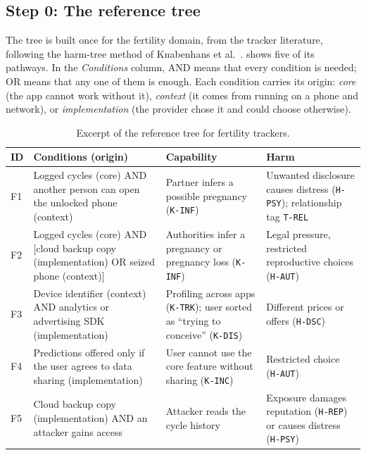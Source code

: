 \subsection*{Step 0: The reference tree}

The tree is built once for the fertility domain, from the tracker
literature, following the harm-tree method of Knabenhans et
al.~\parencite{knabenhans2026harms}.  shows five of its
pathways. In the \emph{Conditions} column, AND means that every condition is
needed; OR means that any one of them is enough. Each condition carries its
origin: \emph{core} (the app cannot work without it), \emph{context} (it comes
from running on a phone and network), or \emph{implementation} (the provider
chose it and could choose otherwise).

\begin{table}[H]
\centering
\caption{Excerpt of the reference tree for fertility trackers.}
\label{tab:we-tree}
\small
\begin{tabularx}{\textwidth}{@{}l>{\raggedright\arraybackslash}X
                                   >{\raggedright\arraybackslash}p{3.1cm}
                                   >{\raggedright\arraybackslash}p{3.3cm}@{}}
\toprule
\textbf{ID} & \textbf{Conditions (origin)} & \textbf{Capability} & \textbf{Harm} \\
\midrule
F1 & Logged cycles (core) AND another person can open the unlocked phone
     (context)
   & Partner infers a possible pregnancy (\texttt{K-INF})
   & Unwanted disclosure causes distress (\texttt{H-PSY}); relationship tag
     \texttt{T-REL} \\
\addlinespace
F2 & Logged cycles (core) AND [cloud backup copy (implementation) OR seized
     phone (context)]
   & Authorities infer a pregnancy or pregnancy loss (\texttt{K-INF})
   & Legal pressure, restricted reproductive choices (\texttt{H-AUT}) \\
\addlinespace
F3 & Device identifier (context) AND analytics or advertising SDK
     (implementation)
   & Profiling across apps (\texttt{K-TRK}); user sorted as
     \enquote{trying to conceive} (\texttt{K-DIS})
   & Different prices or offers (\texttt{H-DSC}) \\
\addlinespace
F4 & Predictions offered only if the user agrees to data sharing
     (implementation)
   & User cannot use the core feature without sharing (\texttt{K-INC})
   & Restricted choice (\texttt{H-AUT}) \\
\addlinespace
F5 & Cloud backup copy (implementation) AND an attacker gains access
   & Attacker reads the cycle history
   & Exposure damages reputation (\texttt{H-REP}) or causes distress
     (\texttt{H-PSY}) \\
\bottomrule
\end{tabularx}
\end{table}

